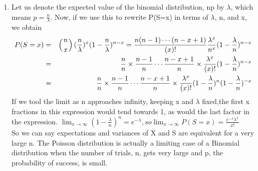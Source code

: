 \documentclass[12pt,thmsa]{article}
\begin{document}
\begin{enumerate}
\item Let us denote the expected value of the binomial distribution, np by $ \lambda $, which means $ p=\frac{n}{\lambda} $.  Now, if we use this to rewrite P(S=x) in terms of $\lambda$, n, and x, we obtain \\
\begin{eqnarray*}
P(S = x) &= & \left( { n \atop x } \right)(\frac{n}{\lambda})^x(1-{\frac{n}{\lambda}})^{n-x}  = \frac{n(n-1) \cdots (n-x+1)}{(x)!}\frac{\lambda^x}{n^x}(1-\frac{\lambda}{n})^{n-x}\\ 
& = & \frac{n}{n}\times \frac{n-1}{n} \cdots \frac{n-x+1}{n} \times \frac{\lambda^x}{(x)!}(1-\frac{\lambda}{n})^{n-x}\\
&=& \frac{n}{n}\times \frac{n-1}{n} \cdots \frac{n-x+1}{n} \times \frac{\lambda^x}{(x)!}(1-\frac{\lambda}{n})^{n}(1-\frac{\lambda}{n})^{-x}\\ 
\end{eqnarray*}
If we tool the limit as n approaches infinity, keeping x and $\lambda$ fixed,the first x fractions in this expression would tend towards 1, as would the last factor in the expression. $ \lim_{x\to\infty} (1-\frac{\lambda}{n})^{n} =  e^{-\lambda}, so \lim_{x\to\infty}P(S=x)= \frac{e^{-\lambda}{\lambda}^x}{x!} $\\
So we can say expectations and variances of X and S are equivalent for a very large n. The Poisson distribution is actually a limiting case of a Binomial distribution when the number of trials, n, gets very large and p, the probability of success, is small.

 
\end{enumerate}
\end{document}
